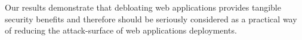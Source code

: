 Our results demonstrate that debloating web applications
provides tangible security benefits and therefore should be seriously
considered as a practical way of reducing the attack-surface of
web applications deployments.


